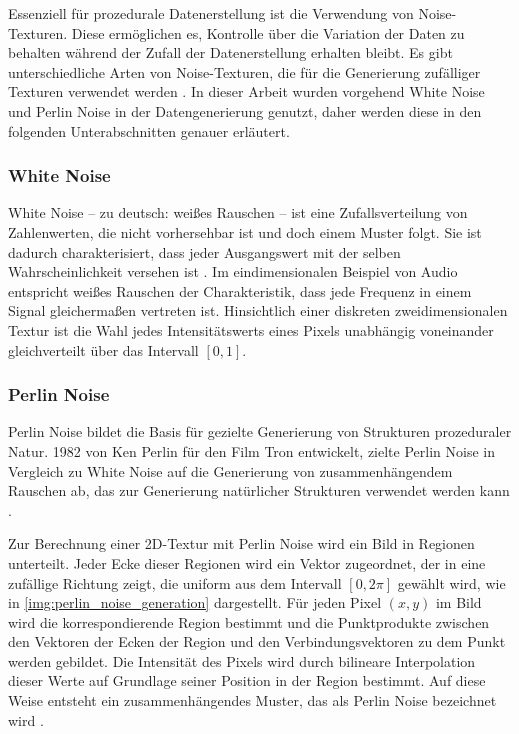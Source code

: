 Essenziell für prozedurale Datenerstellung ist die Verwendung von Noise-Texturen. Diese ermöglichen es, Kontrolle über die Variation der Daten zu behalten während der Zufall der Datenerstellung erhalten bleibt. Es gibt unterschiedliche Arten von Noise-Texturen, die für die Generierung zufälliger Texturen verwendet werden \cite{noise_generation}. In dieser Arbeit wurden vorgehend White Noise und Perlin Noise in der Datengenerierung genutzt, daher werden diese in den folgenden Unterabschnitten genauer erläutert.

\subsubsection{White Noise}

White Noise -- zu deutsch: weißes Rauschen -- ist eine Zufallsverteilung von Zahlenwerten, die nicht vorhersehbar ist und doch einem Muster folgt. Sie ist dadurch charakterisiert, dass jeder Ausgangswert mit der selben Wahrscheinlichkeit versehen ist \cite{white_noise}. Im eindimensionalen Beispiel von Audio entspricht weißes Rauschen der Charakteristik, dass jede Frequenz in einem Signal gleichermaßen vertreten ist. Hinsichtlich einer diskreten zweidimensionalen Textur ist die Wahl jedes Intensitätswerts eines Pixels unabhängig voneinander gleichverteilt über das Intervall $[0, 1]$.

\subsubsection{Perlin Noise}

Perlin Noise bildet die Basis für gezielte Generierung von Strukturen prozeduraler Natur. 1982 von Ken Perlin für den Film Tron entwickelt, zielte Perlin Noise in Vergleich zu White Noise auf die Generierung von zusammenhängendem Rauschen ab, das zur Generierung natürlicher Strukturen verwendet werden kann \cite{perlin_noise_original,perlin_noise_extension}.

Zur Berechnung einer 2D-Textur mit Perlin Noise wird ein Bild in Regionen unterteilt. Jeder Ecke dieser Regionen wird ein Vektor zugeordnet, der in eine zufällige Richtung zeigt, die uniform aus dem Intervall $[0, 2\pi]$ gewählt wird, wie in \autoref{img:perlin_noise_generation} dargestellt. Für jeden Pixel $(x, y)$ im Bild wird die korrespondierende Region bestimmt und die Punktprodukte zwischen den Vektoren der Ecken der Region und den Verbindungsvektoren zu dem Punkt werden gebildet. Die Intensität des Pixels wird durch bilineare Interpolation dieser Werte auf Grundlage seiner Position in der Region bestimmt. Auf diese Weise entsteht ein zusammenhängendes Muster, das als Perlin Noise bezeichnet wird \cite{perlin_noise_original}.

